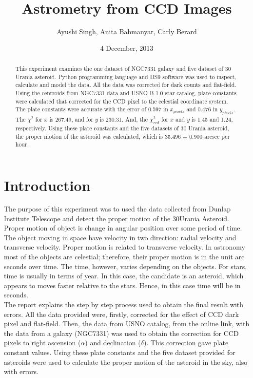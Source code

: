 \documentclass[a4paper,12pt]{article}
\makeatletter
\newcommand{\myemail}{ayushi.singh@mail.utoronto.ca}
\newcommand{\anita}{anita.bahmanyar@mail.utoronto.ca}
\newcommand{\carly}{c.berard@mail.utoronot.ca}
\makeatother
\begin{document}
\onehalfspacing
\title{Astrometry from CCD Images}
\author{Ayushi Singh, Anita Bahmanyar, Carly Berard}
\affil{\small {\myemail}}%
\date{4 December, 2013}
\maketitle

\begin{abstract}
\label{abstract}
This experiment examines the one dataset of NGC7331 galaxy and five dataset of 30 Urania asteroid. Python programming language and DS9 software was used to inspect, calculate and model the data. All the data was corrected for dark counts and flat-field. Using the centroids from NGC7331 data and USNO B-1.0 star catalog, plate constants were calculated that corrected for the CCD pixel to the celestial coordinate system. The plate constants were accurate with the error of 0.597 in $x_{pixels}$ and 0.476 in $y_{pixels}$. The $\chi^2$ for $x$ is 267.49, and for $y$ is 230.31. And, the $\chi_{red}^{2}$ for $x$ and $y$ is 1.45 and 1.24, respectively. Using these plate constants and the five datasets of 30 Urania asteroid, the proper motion of the asteroid was calculated, which is 35.496 $\pm$ 0.900 arcsec per hour. 
\end{abstract}

\section{Introduction}
\label{sec:introduction}
The purpose of this experiment was to used the data collected from Dunlap Institute Telescope and detect the proper motion of the 30Urania Asteroid. Proper motion of object is change in angular position over some period of time. The object moving in space have velocity in two direction: radial velocity and transverse velocity. Proper motion is related to transverse velocity. In astronomy most of the objects are celestial; therefore, their proper motion is in the unit arc seconds over time. The time, however, varies depending on the objects. For stars, time is usually in terms of year. In this case, the candidate is an asteroid, which appears to moves faster relative to the stars. Hence, in this case time will be in seconds.
 \\
\indent The report explains the step by step process used to obtain the final result with errors. All the data provided were, firstly, corrected for the effect of CCD dark pixel and flat-field. Then, the data from USNO catalog, from the online link, with the data from a galaxy (NGC7331) was used to obtain the correction for CCD pixels to right ascension ($\alpha$) and declination ($\delta$). This correction gave plate constant values. Using these plate constants and the five dataset provided for asteroids  were used to calculate the proper motion of the asteroid in the sky, also with errors.
\end{document}
